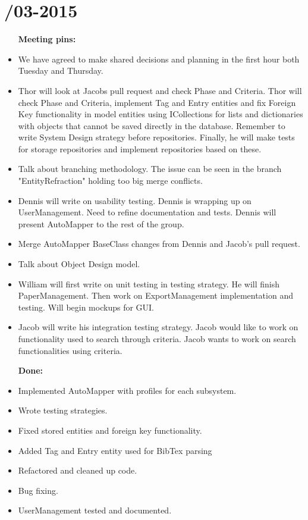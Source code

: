 \section{/03-2015} %
\attend{\at}{\at}{\at}{\at}


\begin{itemize}
	\item [\textbf{Meeting pins:}]
	\item We have agreed to make shared decisions and planning in the first hour both Tuesday and Thursday. 
	\item Thor will look at Jacobs pull request and check Phase and Criteria. Thor will check Phase and Criteria, implement Tag and Entry entities and fix Foreign Key functionality in model entities using ICollections for lists and dictionaries with objects that cannot be saved directly in the database. Remember to write System Design strategy before repositories. Finally, he will make tests for storage repositories and implement repositories based on these. 
	\item Talk about branching methodology. The issue can be seen in the branch "EntityRefraction" holding too big merge conflicts.
	\item Dennis will write on usability testing. Dennis is wrapping up on UserManagement. Need to refine documentation and tests. Dennis will present AutoMapper to the rest of the group. 
	\item Merge AutoMapper BaseClass changes from Dennis and Jacob's pull request. 
	\item Talk about Object Design model. 
	\item William will first write on unit testing in testing strategy. He will finish PaperManagement. Then work on ExportManagement implementation and testing. Will begin mockups for GUI. 
	\item Jacob will write his integration testing strategy. Jacob would like to work on functionality used to search through criteria. Jacob wants to work on search functionalities using criteria. 
\end{itemize}

\begin{itemize}
	\item [\textbf{Done:}]
	\item Implemented AutoMapper with profiles for each subsystem.
	\item Wrote testing strategies. 
	\item Fixed stored entities and foreign key functionality.
	\item Added Tag and Entry entity used for BibTex parsing
	\item Refactored and cleaned up code.
	\item Bug fixing. 
	\item UserManagement tested and documented. 
\end{itemize}

